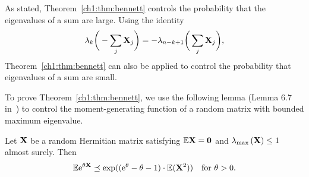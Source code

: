 As stated, Theorem~\ref{ch1:thm:bennett} controls the probability that the
eigenvalues of a sum are large. Using the identity
\[
\lambda_k\bigg(-\sum_j \mathbf{X}_j\bigg) = -\lambda_{n-k+1}\bigg(\sum_j
\mathbf{X}_j\bigg),
\]
Theorem~\ref{ch1:thm:bennett} can also be applied to control the probability that
eigenvalues of a sum are small. 

To prove Theorem~\ref{ch1:thm:bennett}, we use the following lemma (Lemma 6.7 in~\cite{T10a})
to control the moment-generating function of a random matrix with bounded maximum eigenvalue.
 
\begin{lemma}
Let $\mathbf{X}$ be a random Hermitian matrix satisfying $\mathbb{E}\mathbf{X} = \mathbf{0}$
and $\lambda_{\mathrm{max}}\left(\mathbf{X}\right) \leq 1$ almost surely. Then
\[ 
\mathbb{E}\mathrm{e}^{\theta\mathbf{X}} \preceq \mathrm{exp}((\mathrm{e}^{\theta} - \theta - 1) \cdot
\mathbb{E}(\mathbf{X}^2)) \quad \text{for } \theta > 0. 
\]
\label{ch1:lemma:freedmanmgf}
\end{lemma}


